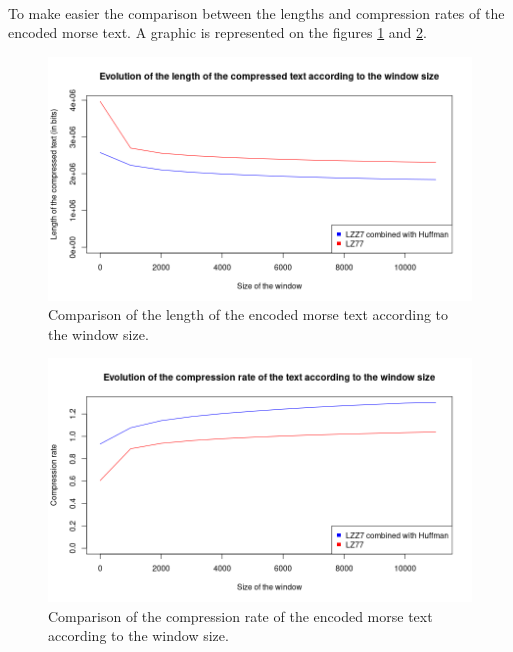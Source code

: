 \documentclass[a4paper, 11pt, oneside]{article}
\begin{document}
\paragraph{}To make easier the comparison between the lengths and compression rates of the encoded morse text. A graphic is represented on the figures \ref{fig:length_comparison} and \ref{fig:compression_rate_comparison}.

\begin{figure}[H]
\center
    \includegraphics[scale=0.7]{length_comparison.png}
    \caption{Comparison of the length of the encoded morse text according to the window size.}
    \label{fig:length_comparison}
    \end{figure}

\begin{figure}[H]
    \center
    \includegraphics[scale=0.7]{compression_rate_comparison.png}
    \caption{Comparison of the compression rate of the encoded morse text according to the window size.}
    \label{fig:compression_rate_comparison}
    \end{figure}
\end{document}
